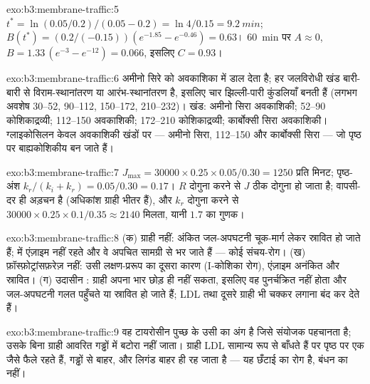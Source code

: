\begin{solution}{exo:b3:membrane-traffic:5}
$t^{*} = \ln(0.05/0.2)/(0.05 - 0.2) = \ln 4/0.15 = \qty{9.2}{min}$;
$B(t^{*}) = (0.2/(-0.15))(e^{-1.85} - e^{-0.46}) = 0.63$। \qty{60}{min} पर
$A \approx 0$, $B = 1.33\,(e^{-3} - e^{-12}) = 0.066$, इसलिए $C = 0.93$।
\end{solution}

\begin{solution}{exo:b3:membrane-traffic:6}
 अमीनो सिरे को अवकाशिका में डाल देता है; हर जलविरोधी खंड
बारी-बारी से विराम-स्थानांतरण या आरंभ-स्थानांतरण है, इसलिए चार
झिल्ली-पारी कुंडलियाँ बनती हैं (लगभग अवशेष 30--52,
90--112, 150--172, 210--232)। खंड: अमीनो सिरा अवकाशिकी;
52--90 कोशिकाद्रव्यी; 112--150 अवकाशिकी; 172--210 कोशिकाद्रव्यी;
कार्बोक्सी सिरा अवकाशिकी। ग्लाइकोसिलन केवल अवकाशिकी खंडों पर ---
अमीनो सिरा, 112--150 और कार्बोक्सी सिरा --- जो पृष्ठ पर बाह्यकोशिकीय
बन जाते हैं।
\end{solution}

\begin{solution}{exo:b3:membrane-traffic:7}
$J_{\max} = \num{30000}\times 0.25\times 0.05/0.30 = 1250$ प्रति मिनट;
पृष्ठ-अंश $k_{r}/(k_{i} + k_{r}) = 0.05/0.30 = 0.17$। $R$ दोगुना करने
से $J$ ठीक दोगुना हो जाता है; वापसी-दर ही अड़चन है (अधिकांश ग्राही
भीतर हैं), और $k_{r}$ दोगुना करने से $\num{30000}\times 0.25
\times 0.1/0.35 \approx 2140$ मिलता, यानी $1.7$ का गुणक।
\end{solution}

\begin{solution}{exo:b3:membrane-traffic:8}
(क) ग्राही नहीं: अंकित जल-अपघटनी चूक-मार्ग लेकर स्रावित हो जाते हैं;
 में एंज़ाइम नहीं रहते और वे अपचित सामग्री से भर जाते हैं ---
कोई संचय-रोग। (ख) फ़ॉस्फ़ोट्रांसफ़रेज़ नहीं: उसी लक्षण-प्ररूप का
दूसरा कारण (I-कोशिका रोग), एंज़ाइम अनंकित और स्रावित। (ग) उदासीन
: ग्राही अपना भार छोड़ ही नहीं सकता, इसलिए वह पुनर्चक्रित नहीं
होता और जल-अपघटनी गलत पहुँचते या स्रावित हो जाते हैं; LDL तथा दूसरे
ग्राही भी चक्कर लगाना बंद कर देते हैं।
\end{solution}

\begin{solution}{exo:b3:membrane-traffic:9}
वह टायरोसीन पुच्छ के उसी  का अंग है जिसे  संयोजक
पहचानता है; उसके बिना ग्राही आवरित गड्ढों में बटोरा नहीं जाता।
ग्राही LDL सामान्य रूप से बाँधते हैं पर पृष्ठ पर एक जैसे फैले रहते
हैं, गड्ढों से बाहर, और लिगंड बाहर ही रह जाता है --- यह छँटाई का
रोग है, बंधन का नहीं।
\end{solution}

